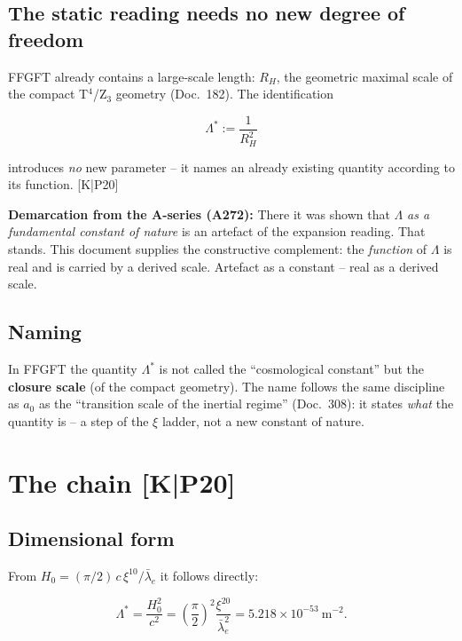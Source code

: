 \section{The static reading needs no new degree of freedom}

FFGFT already contains a large-scale length: $R_H$, the geometric
maximal scale of the compact T$^4$/Z$_3$ geometry (Doc.~182). The
identification

\begin{equation}
  \Lambda^{*} := \frac{1}{R_H^2}
  \label{eq:def}
\end{equation}

introduces \emph{no} new parameter -- it names an already existing
quantity according to its function. [K|P20]

\textbf{Demarcation from the A-series (A272):} There it was shown
that $\Lambda$ \emph{as a fundamental constant of nature} is an
artefact of the expansion reading. That stands. This document
supplies the constructive complement: the \emph{function} of
$\Lambda$ is real and is carried by a derived scale. Artefact as a
constant -- real as a derived scale.

\section{Naming}

In FFGFT the quantity $\Lambda^{*}$ is not called the
\enquote{cosmological constant} but the \textbf{closure scale} (of
the compact geometry). The name follows the same discipline as
$a_0$ as the \enquote{transition scale of the inertial regime}
(Doc.~308): it states \emph{what} the quantity is -- a step of the
$\xi$ ladder, not a new constant of nature.

\chapter{The chain [K|P20]}

\section{Dimensional form}

From $H_0 = (\pi/2)\,c\,\xi^{10}/\bar\lambda_e$ it follows directly:

\begin{equation}
  \Lambda^{*}
  = \frac{H_0^2}{c^2}
  = \left(\frac{\pi}{2}\right)^{2}\frac{\xi^{20}}{\bar\lambda_e^{2}}
  = 5.218\times10^{-53}~\text{m}^{-2}.
  \label{eq:chain}
\end{equation}

